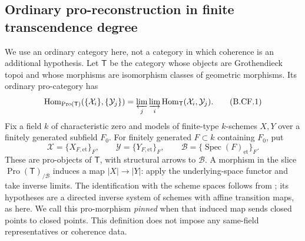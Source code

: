 \documentclass[11pt,a4paper]{article}
\begin{document}
\subsection{Ordinary pro-reconstruction in finite transcendence degree}

We use an ordinary category here, not a category in which coherence is an
additional hypothesis. Let \(\mathsf T\) be the category whose objects are
Grothendieck topoi and whose morphisms are isomorphism classes of geometric
morphisms. Its ordinary pro-category has
\[
 \operatorname{Hom}_{\operatorname{Pro}(\mathsf T)}
       (\{\mathcal X_i\},\{\mathcal Y_j\})
   =\varprojlim_j\varinjlim_i
       \operatorname{Hom}_{\mathsf T}(\mathcal X_i,\mathcal Y_j).
                                                        \tag{B.CF.1}
\]
Fix a field \(k\) of characteristic zero and models of finite-type
\(k\)-schemes \(X,Y\) over a finitely generated subfield \(F_0\).
For finitely generated \(F\subset k\) containing \(F_0\), put
\[
 \mathcal X=\{X_{F,\mathrm{et}}\}_F,
 \qquad \mathcal Y=\{Y_{F,\mathrm{et}}\}_F,
 \qquad \mathcal B=\{\operatorname{Spec}(F)_{\mathrm{et}}\}_F.
\]
These are pro-objects of \(\mathsf T\), with structural arrows to
\(\mathcal B\). A morphism in the slice
\(\operatorname{Pro}(\mathsf T)_{/\mathcal B}\) induces a map
\(|X|\to |Y|\): apply the underlying-space functor and take inverse
limits. The identification with the scheme spaces follows from
\citep[Lemma~32.4.2, Tag~0CUF]{StacksProject}; its hypotheses are a directed
inverse system of schemes with affine transition maps, as here.
We call this pro-morphism \emph{pinned} when that induced map sends
closed points to closed points. This definition does not impose any
same-field representatives or coherence data.
\end{document}
